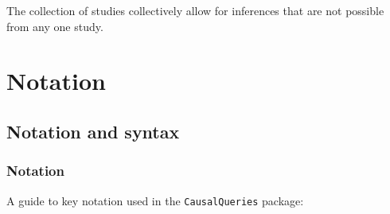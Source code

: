 \documentclass[
  12pt,
]{book}
\begin{document}
The collection of studies collectively allow for inferences that are not possible from any one study.

\hypertarget{part-notation}{%
\part{Notation}\label{part-notation}}

\hypertarget{notation}{%
\chapter{Notation and syntax}\label{notation}}

\hypertarget{notation-1}{%
\section{Notation}\label{notation-1}}

A guide to key notation used in the \texttt{CausalQueries} package:
\end{document}
